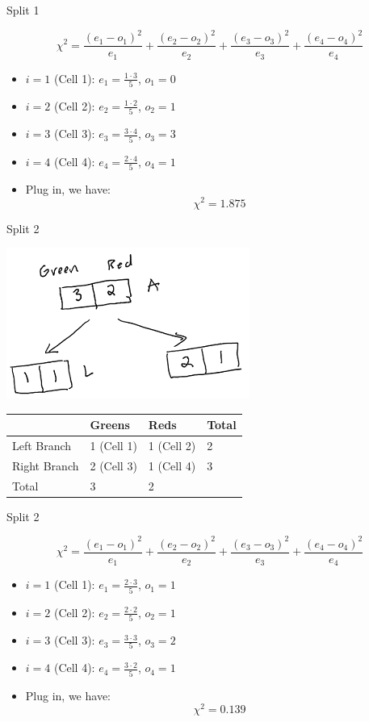 \documentclass[
  ignorenonframetext,
]{beamer}
\begin{document}
\begin{frame}{Split 1}
\protect\hypertarget{split-1-1}{}

\[\chi^2 = \frac{(e_1-o_1)^2}{e_1}+\frac{(e_2-o_2)^2}{e_2}+\frac{(e_3-o_3)^2}{e_3}+\frac{(e_4-o_4)^2}{e_4}\]

\begin{itemize}
\item
  \(i=1\) (Cell 1): \(e_1 = \frac{1\cdot 3}{5}\), \(o_1 = 0\)
\item
  \(i=2\) (Cell 2): \(e_2 = \frac{1\cdot 2}{5}\), \(o_2 = 1\)
\item
  \(i=3\) (Cell 3): \(e_3 = \frac{3\cdot 4}{5}\), \(o_3 = 3\)
\item
  \(i=4\) (Cell 4): \(e_4 = \frac{2\cdot 4}{5}\), \(o_4 = 1\)
\item
  Plug in, we have: \[\chi^2 = 1.875\]
\end{itemize}

\end{frame}

\begin{frame}{Split 2}
\protect\hypertarget{split-2}{}

\includegraphics{images2/im3.png}

\begin{longtable}[]{@{}llll@{}}
\toprule
& Greens & Reds & Total\tabularnewline
\midrule
\endhead
Left Branch & 1 (Cell 1) & 1 (Cell 2) & 2\tabularnewline
Right Branch & 2 (Cell 3) & 1 (Cell 4) & 3\tabularnewline
Total & 3 & 2 &\tabularnewline
\bottomrule
\end{longtable}

\end{frame}

\begin{frame}{Split 2}
\protect\hypertarget{split-2-1}{}

\[\chi^2 = \frac{(e_1-o_1)^2}{e_1}+\frac{(e_2-o_2)^2}{e_2}+\frac{(e_3-o_3)^2}{e_3}+\frac{(e_4-o_4)^2}{e_4}\]

\begin{itemize}
\item
  \(i=1\) (Cell 1): \(e_1 = \frac{2\cdot 3}{5}\), \(o_1 = 1\)
\item
  \(i=2\) (Cell 2): \(e_2 = \frac{2\cdot 2}{5}\), \(o_2 = 1\)
\item
  \(i=3\) (Cell 3): \(e_3 = \frac{3\cdot 3}{5}\), \(o_3 = 2\)
\item
  \(i=4\) (Cell 4): \(e_4 = \frac{3\cdot 2}{5}\), \(o_4 = 1\)
\item
  Plug in, we have: \[\chi^2 = 0.139\]
\end{itemize}

\end{frame}
\end{document}
